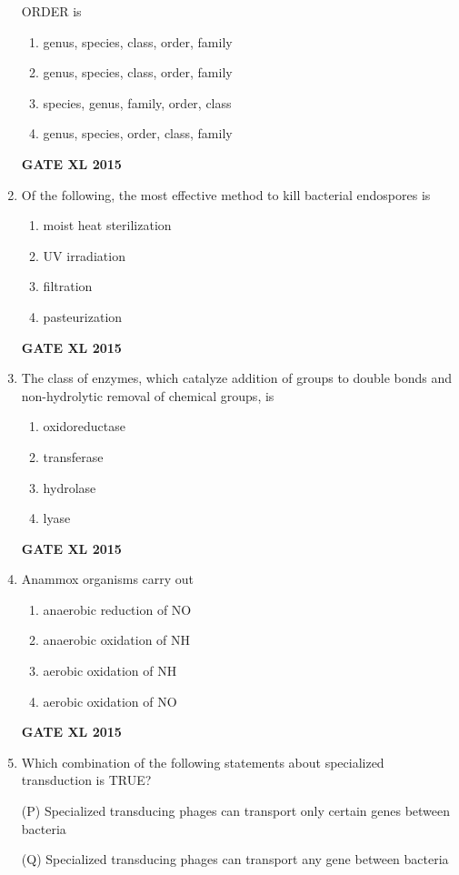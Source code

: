 \documentclass[journal,12pt,onecolumn]{IEEEtran}
\begin{document}
\begin{enumerate}
ORDER is
    \begin{enumerate}
            \item genus, species, class, order, family
	    \item genus, species, class, order, family
	    \item species, genus, family, order, class
            \item genus, species, order, class, family
    \end{enumerate}
\hfill{\textbf{GATE XL 2015}}
\item Of the following, the most effective method to kill bacterial endospores is 
    \begin{enumerate}
            \item moist heat sterilization
	    \item UV irradiation
	    \item filtration
            \item pasteurization
    \end{enumerate}
\hfill{\textbf{GATE XL 2015}}
\item The class of enzymes, which catalyze addition of groups to double bonds and non-hydrolytic removal of chemical groups, is
    \begin{enumerate}
            \item oxidoreductase
	    \item transferase
	    \item hydrolase
            \item lyase
    \end{enumerate}
\hfill{\textbf{GATE XL 2015}}
\item Anammox organisms carry out
    \begin{enumerate}
            \item anaerobic reduction of NO
	    \item anaerobic oxidation of NH 
	    \item aerobic oxidation of NH
            \item aerobic oxidation of NO
    \end{enumerate}
\hfill{\textbf{GATE XL 2015}}
\item Which combination of the following statements about specialized transduction is TRUE?

	(P) Specialized transducing phages can transport only certain genes between bacteria

(Q) Specialized transducing phages can transport any gene between bacteria


\end{enumerate}
\end{document}
